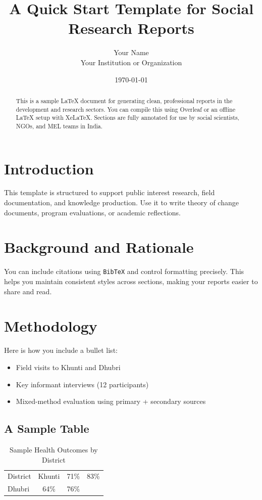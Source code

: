 \documentclass[12pt]{article}
\title{A Quick Start Template for Social Research Reports}
\author{Your Name \\
Your Institution or Organization}
\date{\today}
\begin{document}
\maketitle

\begin{abstract}
This is a sample LaTeX document for generating clean, professional reports in the development and research sectors. You can compile this using Overleaf or an offline LaTeX setup with XeLaTeX. Sections are fully annotated for use by social scientists, NGOs, and MEL teams in India.
\end{abstract}

\section{Introduction}
This template is structured to support public interest research, field documentation, and knowledge production. Use it to write theory of change documents, program evaluations, or academic reflections.

\section{Background and Rationale}
You can include citations using \texttt{BibTeX} and control formatting precisely. This helps you maintain consistent styles across sections, making your reports easier to share and read.

\section{Methodology}
Here is how you include a bullet list:
\begin{itemize}
  \item Field visits to Khunti and Dhubri
  \item Key informant interviews (12 participants)
  \item Mixed-method evaluation using primary + secondary sources
\end{itemize}

\subsection*{A Sample Table}
\begin{table}[h!]
\centering
\begin{tabular}{lcc}
\toprule
District & %
\midrule
Khunti & 71\% & 83\% \\
Dhubri & 64\% & 76\% \\
\bottomrule
\end{tabular}
\caption{Sample Health Outcomes by District}
\end{table}
\end{document}
